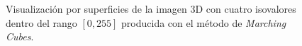 \begin{figure}[htp]
\begin{center}
  \end{center}
  \caption[Visualización por superficies de la imagen 3D con cuatro isovalores distintos]{Visualización por superficies de la imagen 3D con cuatro isovalores dentro del rango $[0,255]$ producida con el método de \emph{Marching Cubes}.}
  \label{fig:visIsoSurface}
  \end{figure}


